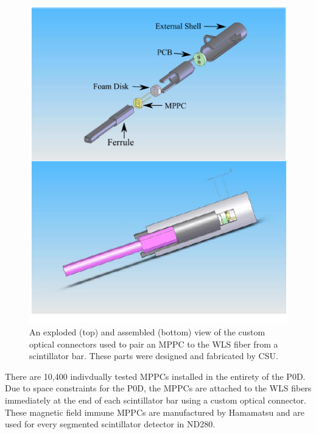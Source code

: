 \begin{figure}
\begin{center}
\includegraphics[width=5in]{./Figures/mppc2.png}
\end{center}
\caption{An exploded (top) and assembled (bottom) view of the custom
  optical connectors used to pair an MPPC to the WLS fiber from a
  scintillator bar. These parts were designed and fabricated by CSU.}
\label{fig:mppc}
\end{figure}

There are 10,400 indivdually tested MPPCs installed in the entirety
of the P0D. Due to space constraints for the P0D, the MPPCs are
attached to the WLS fibers immediately at the end of each scintillator
bar using a custom optical connector. These magnetic field immune
MPPCs are manufactured by Hamamatsu and are used for every segmented
scintillator detector in ND280.

